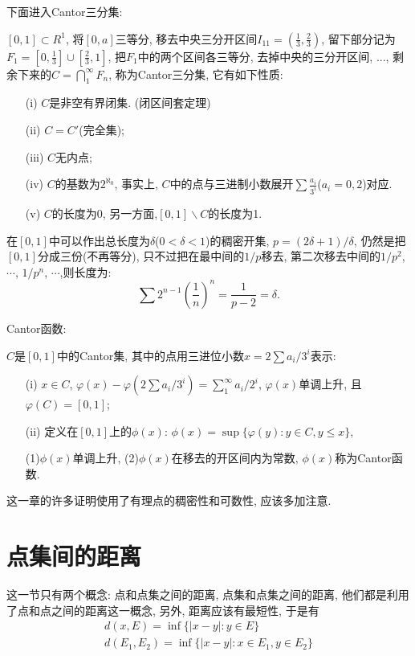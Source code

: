 \documentclass[12pt,a4paper,openany]{book}
\begin{document}
下面进入Cantor三分集:

$[0,1] \subset R^1$, 将$[0, a]$三等分, 移去中央三分开区间$I_{11} = (\frac{1}{3}, \frac{2}{3})$, 留下部分记为$F_1 = [0, \frac{1}{3}] \cup [\frac{2}{3}, 1]$, 把$F_1$中的两个区间各三等分, 去掉中央的三分开区间, ..., 剩余下来的$C = \bigcap_{1}^{\infty}{F_n}$, 称为Cantor三分集, 它有如下性质:
\begin{enumerate}
\item[(i)]$C$是非空有界闭集. (闭区间套定理)
\item[(ii)]$C = C'$(完全集);
\item[(iii)]$C$无内点;
\item[(iv)]$C$的基数为$2^{\aleph_0}$, 事实上, $C$中的点与三进制小数展开$\sum{\frac{a_i}{3^i}}$($a_i = 0, 2$)对应.
\item[(v)]$C$的长度为0, 另一方面,$[0,1] \backslash C$的长度为1.
\end{enumerate}

在$[0,1]$中可以作出总长度为$\delta$($0 < \delta < 1$)的稠密开集, $p = (2\delta + 1)/\delta$, 仍然是把$[0,1]$分成三份(不再等分), 只不过把在最中间的$1/p$移去, 第二次移去中间的$1/p^2$, $\cdots$, $1/p^n$, $\cdots$,则长度为: 
\[
\sum{2^{n-1}(\frac{1}{n})^n} = \frac{1}{p-2} = \delta.
\]

Cantor函数:

$C$是$[0,1]$中的Cantor集, 其中的点用三进位小数$x = 2\sum{a_i/3^i}$表示:
\begin{enumerate}
\item[(i)]$x \in C$, $\varphi(x) - \varphi(2\sum{a_i/3^i}) = \sum_{1}^{\infty}{a_i/2^i}$, $\varphi(x)$单调上升, 且$\varphi(C) = [0,1]$;
\item[(ii)]定义在$[0,1]$上的$\phi(x)$: $\phi(x) = \sup\{\varphi(y) : y \in C, y \le x\}$,

(1)$\phi(x)$单调上升, (2)$\phi(x)$在移去的开区间内为常数, $\phi(x)$称为Cantor函数.
\end{enumerate}

这一章的许多证明使用了有理点的稠密性和可数性, 应该多加注意.

\section{点集间的距离}
这一节只有两个概念: 点和点集之间的距离, 点集和点集之间的距离, 他们都是利用了点和点之间的距离这一概念, 另外, 距离应该有最短性, 于是有
\begin{gather*}
d(x, E) = \inf\{|x - y| : y \in E\} \\
d(E_1,E_2) = \inf\{|x - y| : x \in E_1, y \in E_2\}
\end{gather*}
\end{document}
